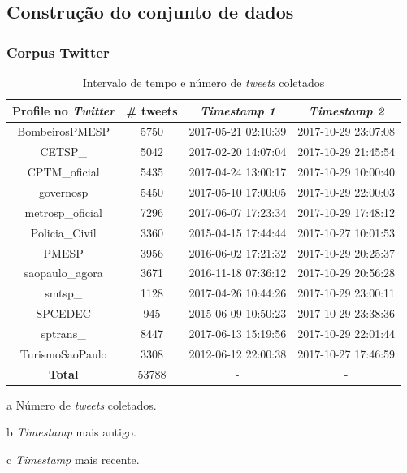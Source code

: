 \documentclass{beamer}
\begin{document}
\subsection{Construção do conjunto de dados}
\begin{frame}
\frametitle{Corpus Twitter}
\begin{table}[!htb]
\centering
\caption{Intervalo de tempo e número de \textit{tweets} coletados}
	\label{tab:tweetsCollected}
\begin{adjustbox}{max height=28mm}
\begin{threeparttable}
\begin{tabular}{c|c|c|c}
\hline
\textbf {Profile no \textit{Twitter}} &\textbf{ \# tweets \tnote{a}}  &\textbf{ \textit{Timestamp 1 \tnote{b}}} & \textbf{\textit{Timestamp 2 \tnote{c}}} \\ 
\hline
BombeirosPMESP & 5750 & 2017-05-21 02:10:39 & 2017-10-29 23:07:08  \\
\hline
CETSP\_ & 5042 & 2017-02-20 14:07:04 & 2017-10-29 21:45:54 \\ 
\hline
CPTM\_oficial & 5435 & 2017-04-24 13:00:17 & 2017-10-29 10:00:40 \\ 
\hline
governosp & 5450 & 2017-05-10 17:00:05 & 2017-10-29 22:00:03 \\
\hline
metrosp\_oficial & 7296 & 2017-06-07 17:23:34  & 2017-10-29 17:48:12 \\
\hline
Policia\_Civil & 3360 & 2015-04-15 17:44:44 & 2017-10-27 10:01:53 \\  
\hline
PMESP & 3956 & 2016-06-02 17:21:32 & 2017-10-29 20:25:37 \\ 
\hline
saopaulo\_agora & 3671 & 2016-11-18 07:36:12 & 2017-10-29 20:56:28 \\
\hline
smtsp\_ & 1128 & 2017-04-26 10:44:26 & 2017-10-29 23:00:11 \\ 
\hline
SPCEDEC & 945 & 2015-06-09 10:50:23 & 2017-10-29 23:38:36 \\
\hline
sptrans\_ & 8447 & 2017-06-13 15:19:56 & 2017-10-29 22:01:44 \\
\hline
TurismoSaoPaulo & 3308 & 2012-06-12 22:00:38 & 2017-10-27 17:46:59 \\ 
\hline
\hline
\textbf{Total} & 53788 & - & -   \\
\hline
\hline
\end{tabular}
\begin{tablenotes}
            \item[a] Número de \textit{tweets} coletados.
            \item[b] \textit{Timestamp} mais antigo.
            \item[c] \textit{Timestamp} mais recente.
        \end{tablenotes}
\end{threeparttable}
\end{adjustbox}
\end{table}
\end{frame}
\end{document}
